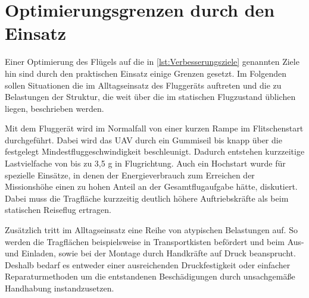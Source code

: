 \section{Optimierungsgrenzen durch den Einsatz}

Einer Optimierung des Flügels auf die in \ref{lst:Verbesserungsziele} genannten Ziele hin sind durch den praktischen Einsatz einige Grenzen gesetzt.
Im Folgenden sollen Situationen die im Alltagseinsatz des Fluggeräts auftreten und die zu Belastungen der Struktur, die weit über die im statischen Flugzustand üblichen liegen, beschrieben werden.

Mit dem Fluggerät wird im Normalfall von einer kurzen Rampe im Flitschenstart durchgeführt. Dabei wird das UAV durch ein Gummiseil bis knapp über die festgelegt Mindestfluggeschwindigkeit beschleunigt. Dadurch entstehen kurzzeitige Lastvielfache von bis zu 3,5 g in Flugrichtung.
Auch ein Hochstart wurde für spezielle Einsätze, in denen der Energieverbrauch zum Erreichen der Missionshöhe einen zu hohen Anteil an der Gesamtflugaufgabe hätte, diskutiert. 
Dabei muss die Tragfläche kurzzeitig deutlich höhere Auftriebskräfte als beim statischen Reiseflug ertragen. 

Zusätzlich tritt im Alltagseinsatz eine Reihe von atypischen Belastungen auf. So werden die Tragflächen beispielsweise in Transportkisten befördert und beim Aus- und Einladen, sowie bei der Montage durch Handkräfte auf Druck beansprucht. Deshalb bedarf es entweder einer ausreichenden Druckfestigkeit oder einfacher Reparaturmethoden um die entstandenen Beschädigungen durch unsachgemäße Handhabung instandzusetzen.
